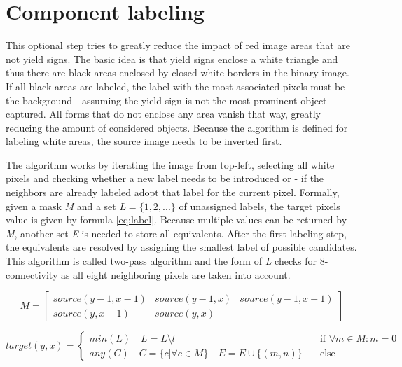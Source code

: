 \documentclass{report}
\begin{document}
{\color{red}{Picture examples}}


\section{Component labeling}

This optional step tries to greatly reduce the impact of red image
areas that are not yield signs. The basic idea is that yield signs
enclose a white triangle and thus there are black areas enclosed by
closed white borders in the binary image. If all black areas are
labeled, the label with the most associated pixels must be the
background - assuming the yield sign is not the most prominent object
captured. All forms that do not enclose any area vanish that way,
greatly reducing the amount of considered objects. Because the
algorithm is defined for labeling white areas, the source image needs
to be inverted first.

The algorithm works by iterating the image from top-left, selecting
all white pixels and checking whether a new label needs to be
introduced or - if the neighbors are already labeled adopt that label
for the current pixel. Formally, given a mask \textit{M} and a set \(
L = \{1, 2, ... \} \) of unassigned labels, the target pixels value is
given by formula \ref{eq:label}. Because multiple values can be
returned by \textit{M}, another set \textit{E} is needed to store all
equivalents. After the first labeling step, the equivalents are
resolved by assigning the smallest label of possible candidates. This
algorithm is called two-pass algorithm and the form of \textit{L}
checks for 8-connectivity as all eight neighboring pixels are taken
into account.

\begin{equation}
  M = \begin{bmatrix}
    source(y-1, x-1) & source(y-1, x) & source(y-1, x+1) \\
    source(y, x-1)   & source(y, x)   & -
  \end{bmatrix}
\end{equation}


\begin{equation}\label{eq:label}
    target(y, x) =
    \begin{cases}
      min(L) \quad L = L \setminus l & \quad \text{if } \forall m \in M: m = 0 \\
      any(C) \quad C = \{ c | \forall c \in M \} \quad E = E \cup \{(m, n)\} & \quad \text{else}
    \end{cases}
\end{equation}
\end{document}
